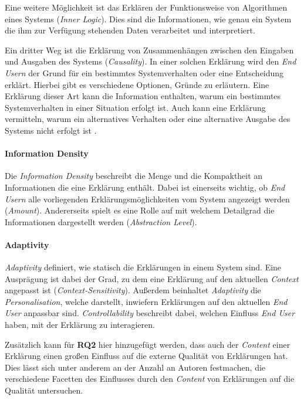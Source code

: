 Eine weitere Möglichkeit ist das Erklären der Funktionsweise von Algorithmen eines Systems (\textit{Inner Logic}). Dies sind die Informationen, wie genau ein System die ihm zur Verfügung stehenden Daten verarbeitet und interpretiert.

Ein dritter Weg ist die Erklärung von Zusammenhängen zwischen den Eingaben und Ausgaben des Systems (\textit{Causality}). In einer solchen Erklärung wird den \textit{End Usern} der Grund für ein bestimmtes Systemverhalten oder eine Entscheidung erklärt. Hierbei gibt es verschiedene Optionen, Gründe zu erläutern. Eine Erklärung dieser Art kann die Information enthalten, warum ein bestimmtes Systemverhalten in einer Situation erfolgt ist. Auch kann eine Erklärung vermitteln, warum ein alternatives Verhalten oder eine alternative Ausgabe des Systems nicht erfolgt ist \cite{martin_evaluating_2021}. %


\paragraph{Information Density} Die \textit{Information Density} beschreibt die Menge und die Kompaktheit an Informationen die eine Erklärung enthält. Dabei ist einerseits wichtig, ob \textit{End Usern} alle vorliegenden Erklärungsmöglichkeiten vom System angezeigt werden (\textit{Amount}). Andererseits spielt es eine Rolle auf mit welchem Detailgrad die Informationen dargestellt werden (\textit{Abstraction Level}).

\paragraph{Adaptivity} \textit{Adaptivity} definiert, wie statisch die Erklärungen in einem System sind. Eine Ausprägung ist dabei der Grad, zu dem eine Erklärung auf den aktuellen \textit{Context} angepasst ist (\textit{Context-Sensitivity}). Außerdem beinhaltet \textit{Adaptivity} die \textit{Personalisation}, welche darstellt, inwiefern Erklärungen auf den aktuellen \textit{End User} anpassbar sind. \textit{Controllability} beschreibt dabei, welchen Einfluss \textit{End User} haben, mit der Erklärung zu interagieren.

\bigskip

Zusätzlich kann für \textbf{RQ2} hier hinzugefügt werden, dass auch der \textit{Content} einer Erklärung einen großen Einfluss auf die externe Qualität von Erklärungen hat. Dies lässt sich unter anderem an der Anzahl an Autoren festmachen, die verschiedene Facetten des Einflusses durch den \textit{Content} von Erklärungen auf die Qualität untersuchen.

